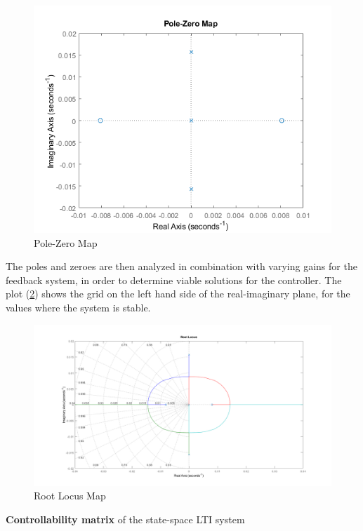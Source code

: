 \begin{figure}[h!]
  \centering
  \includegraphics[scale=0.8]{graphics/PoleZeromap.png}
  \caption{Pole-Zero Map}
  \label{fig:Pole-Zero Map}
\end{figure}


The poles and zeroes are then analyzed in combination with varying gains for the feedback system, in order to determine viable solutions for the controller. The plot (\ref{fig:Root Locus Map}) shows the grid on the left hand side of the real-imaginary plane, for the values where the system is stable. 

\begin{figure}[h!]
  \centering
  \includegraphics[scale=0.45]{graphics/rlocus.png}
  \caption{Root Locus Map}
  \label{fig:Root Locus Map}
\end{figure}


\textbf{Controllability matrix} of the state-space LTI system

